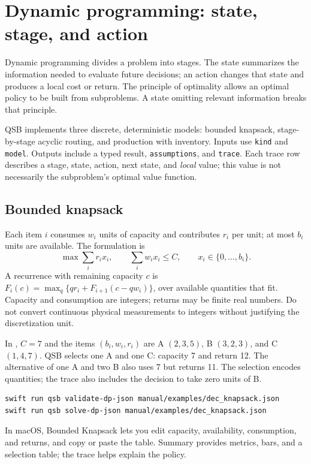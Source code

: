 \section{Dynamic programming: state, stage, and action}
Dynamic programming divides a problem into stages. The state summarizes the
information needed to evaluate future decisions; an action changes that state
and produces a local cost or return. The principle of optimality allows an
optimal policy to be built from subproblems. A state omitting relevant
information breaks that principle.

QSB implements three discrete, deterministic models: bounded knapsack,
stage-by-stage acyclic routing, and production with inventory. Inputs use
\texttt{kind} and \texttt{model}. Outputs include a typed result,
\texttt{assumptions}, and \texttt{trace}. Each trace row describes a stage,
state, action, next state, and \emph{local} value; this value is not necessarily
the subproblem's optimal value function.

\subsection{Bounded knapsack}
Each item $i$ consumes $w_i$ units of capacity and contributes $r_i$ per unit;
at most $b_i$ units are available. The formulation is
\[
 \max\sum_i r_i x_i,\qquad \sum_i w_i x_i\leq C,
 \qquad x_i\in\{0,\ldots,b_i\}.
\]
A recurrence with remaining capacity $c$ is
$F_i(c)=\max_q\{q r_i+F_{i+1}(c-qw_i)\}$, over available quantities that fit.
Capacity and consumption are integers; returns may be finite real numbers.
Do not convert continuous physical measurements to integers without justifying
the discretization unit.

In , $C=7$ and the items $(b_i,w_i,r_i)$ are
A $(2,3,5)$, B $(3,2,3)$, and C $(1,4,7)$. QSB selects one A and one C:
capacity 7 and return 12. The alternative of one A and two B also uses 7 but
returns 11. The selection encodes quantities; the trace also includes the
decision to take zero units of B.
\begin{lstlisting}
swift run qsb validate-dp-json manual/examples/dec_knapsack.json
swift run qsb solve-dp-json manual/examples/dec_knapsack.json
\end{lstlisting}
In macOS, Bounded Knapsack lets you edit capacity, availability, consumption,
and returns, and copy or paste the table. Summary provides metrics, bars, and
a selection table; the trace helps explain the policy.

